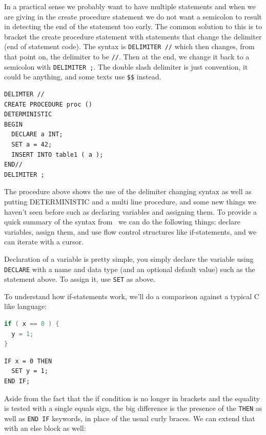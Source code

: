 In a practical sense we probably want to have multiple statements and when we are giving in the create procedure statement we do not want a semicolon to result in detecting the end of the statement too early. The common solution to this is to bracket the create procedure statement with statements that change the delimiter (end of statement code). The syntax is \texttt{DELIMITER //} which then changes, from that point on, the delimiter to be \texttt{//}. Then at the end, we change it back to a semicolon with \texttt{DELIMITER ;}. The double slash delimiter is just convention, it could be anything, and some texts use \texttt{\$\$} instead.

{\small
\begin{verbatim}
DELIMTER //
CREATE PROCEDURE proc () 
DETERMINISTIC
BEGIN
  DECLARE a INT;
  SET a = 42;
  INSERT INTO table1 ( a );
END//
DELIMITER ;
\end{verbatim}
}

The procedure above shows the use of the delimiter changing syntax as well as putting DETERMINISTIC and a multi line procedure, and some new things we haven't seen before such as declaring variables and assigning them. To provide a quick summary of the syntax from~\cite{storedproc} we can do the following things: declare variables, assign them, and use flow control structures like if-statements, and we can iterate with a cursor.

Declaration of a variable is pretty simple, you simply declare the variable using \texttt{DECLARE} with a name and data type (and an optional default value) such as the statement above. To assign it, use \texttt{SET} as above. 

To understand how if-statements work, we'll do a comparison against a typical C like language:

\begin{multicols}{2}
\begin{lstlisting}[language=C]
if ( x == 0 ) {
  y = 1;
} 
\end{lstlisting}
\columnbreak
\begin{verbatim}
IF x = 0 THEN
  SET y = 1;
END IF;
\end{verbatim}
\end{multicols}

Aside from the fact that the if condition is no longer in brackets and the equality is tested with a single equals sign, the big difference is the presence of the \texttt{THEN} as well as \texttt{END IF} keywords, in place of the usual curly braces. We can extend that with an else block as well:

